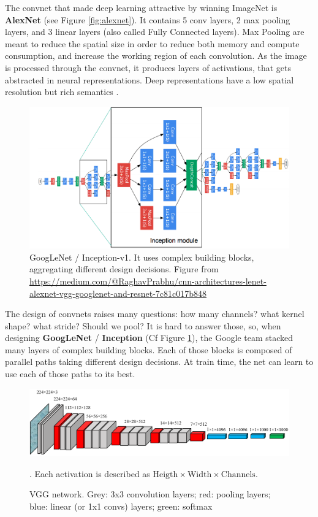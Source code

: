 The convnet that made deep learning attractive by winning ImageNet is \textbf{AlexNet} \citep{alexnet} (see Figure \ref{fig:alexnet}). It contains 5 conv layers, 2 max pooling layers, and 3 linear layers (also called Fully Connected layers). Max Pooling are meant to reduce the spatial size in order to reduce both memory and compute consumption, and increase the working region of each convolution. As the image is processed through the convnet, it produces layers of activations, that gets abstracted in neural representations. Deep representations have a low spatial resolution but rich semantics \citep{deepbelief,deepviz}.

\begin{figure}[t]
    \centering
    \includegraphics[width=\columnwidth]{30-activity/googlenet.png}
    \caption{GoogLeNet / Inception-v1. It uses complex building blocks, aggregating different design decisions. Figure from \url{https://medium.com/@RaghavPrabhu/cnn-architectures-lenet-alexnet-vgg-googlenet-and-resnet-7c81c017b848}}
    \label{fig:googlenet}
\end{figure}

The design of convnets raises many questions: how many channels? what kernel shape? what stride? Should we pool? It is hard to answer those, so, when designing \textbf{GoogLeNet} / \textbf{Inception} \citep{googlenet} (Cf Figure \ref{fig:googlenet}), the Google team stacked many layers of complex building blocks. Each of those blocks is composed of parallel paths taking different design decisions. At train time, the net can learn to use each of those paths to its best.

\begin{figure}[t]
    \centering
    \includegraphics[width=\columnwidth]{30-activity/VGG_neural_network.png}
    \caption{VGG network. Grey: 3x3 convolution layers; red: pooling layers; blue: linear (or 1x1 convs) layers; green: softmax}. Each activation is described as $\text{Heigth} \times \text{Width} \times \text{Channels}$.
    \label{fig:vgg}
\end{figure}

